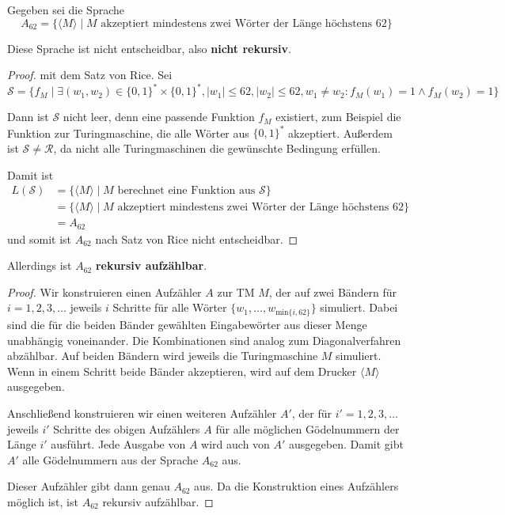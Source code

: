 Gegeben sei die Sprache
\[
A_{62} = \{\langle M \rangle \mid M \text{ akzeptiert mindestens zwei Wörter der
	Länge höchstens } 62 \}
\]

Diese Sprache ist nicht entscheidbar, also \textbf{nicht rekursiv}.

\begin{proof}
mit dem Satz von Rice. Sei 
\[
\mathcal{S} = \{f_M \mid \exists (w_1, w_2) \in \{0,1\}^* \times \{0,1\}^*,
	|w_1| \leq 62, |w_2| \leq 62, w_1 \neq w_2 : f_M(w_1) = 1 \land f_M(w_2) = 1\}
\]

Dann ist $\mathcal{S}$ nicht leer, denn eine passende Funktion $f_M$ existiert,
zum Beispiel die Funktion zur Turingmaschine, die alle Wörter aus $\{0, 1\}^*$
akzeptiert. Außerdem ist $\mathcal{S} \neq \mathcal{R}$, da nicht alle
Turingmaschinen die gewünschte Bedingung erfüllen.

Damit ist
\begin{align*}
	L(\mathcal{S}) &= \{ \langle M \rangle \mid M
		\text{ berechnet eine Funktion aus }\mathcal{S}\} \\
	&= \{ \langle M \rangle \mid M
		\text{ akzeptiert mindestens zwei Wörter der Länge höchstens } 62 \} \\
	&= A_{62}
\end{align*}
und somit ist $A_{62}$ nach Satz von Rice nicht entscheidbar.
\end{proof}

Allerdings ist $A_{62}$ \textbf{rekursiv aufzählbar}.

\begin{proof}
Wir konstruieren einen Aufzähler $A$ zur TM $M$, der auf zwei Bändern für
$i = 1, 2, 3, \dots$ jeweils $i$ Schritte für alle Wörter
$\{w_1, \dots, w_{\text{min}\{i, 62\}}\}$ simuliert. Dabei sind die für die
beiden Bänder gewählten Eingabewörter aus dieser Menge unabhängig voneinander.
Die Kombinationen sind analog zum Diagonalverfahren abzählbar. Auf beiden
Bändern wird jeweils die Turingmaschine $M$ simuliert. Wenn in einem Schritt
beide Bänder akzeptieren, wird auf dem Drucker $\langle M \rangle$ ausgegeben.

Anschließend konstruieren wir einen weiteren Aufzähler $A'$, der für
$i' = 1, 2, 3, \dots$ jeweils $i'$ Schritte des obigen Aufzählers $A$ für alle
möglichen Gödelnummern der Länge $i'$ ausführt. Jede Ausgabe von $A$ wird auch
von $A'$ ausgegeben. Damit gibt $A'$ alle Gödelnummern aus der Sprache $A_{62}$
aus.

	Dieser Aufzähler gibt dann genau $A_{62}$ aus. Da die Konstruktion eines
	Aufzählers möglich ist, ist $A_{62}$ rekursiv aufzählbar.
\end{proof}
